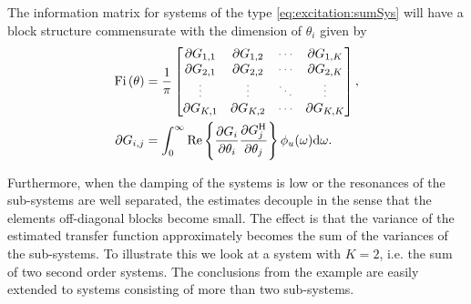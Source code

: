 The information matrix for systems of the type \eqref{eq:excitation:sumSys} will have a block structure commensurate with the dimension of $\theta_i$ given by
\begin{align}
\IF &= \frac{1}{\pi}
\begin{bmatrix}
  \partial G_{1,1}        &\partial G_{1,2}       &\deemph{\cdots}         &\partial G_{1,K}\\
  \partial G_{2,1}        &\partial G_{2,2}       &\deemph{\cdots}         &\partial G_{2,K}\\
  \deemph{\vdots}                  &\deemph{\vdots}                 &\deemph{\ddots}         &\deemph{\vdots}          \\
  \partial G_{K,1}        &\partial G_{K,2}       &\deemph{\cdots}         &\partial G_{K,K}
\end{bmatrix},\\
\partial G_{i,j} &= \int_0^\infty
                      \mathrm{Re}\left\{
                          \frac{\partial G_i}
                               {\partial \theta_i}
                          \frac{\partial G_j^{\HT}}
                               {\partial \theta_j}
                                \right\}
                      \phi_u(\omega)\dd\omega.
\end{align}

Furthermore, when the damping of the systems is low or the resonances of the sub-systems are well separated, the estimates decouple in the sense that the elements off-diagonal blocks become small.
The effect is that the variance of the estimated transfer function approximately becomes the sum of the variances of the sub-systems.
To illustrate this we look at a system with $K=2$, i.e. the sum of two second order systems.
The conclusions from the example are easily extended to systems consisting of more than two sub-systems.

